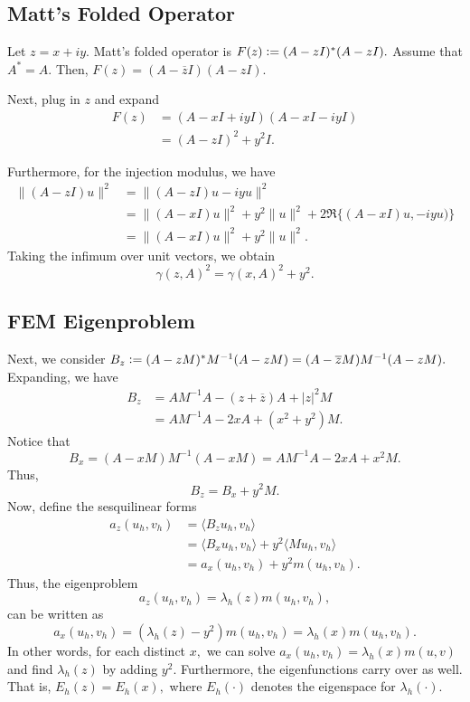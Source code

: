 \documentclass[12pt,a4paper]{article}
\newcommand{\defeq}{\vcentcolon=}
\begin{document}
\subsection{Matt's Folded Operator}

Let $z = x + iy.$ Matt's folded operator is $F(z) \defeq (A-zI)^*(A-zI).$ Assume that $A^*=A.$ Then,
$F(z) = (A-\overline{z}I)(A-zI).$

Next, plug in $z$ and expand
\begin{align}
    F(z) &= (A-xI + iyI)(A-xI-iyI)\\
    &=(A-zI)^2 + y^2 I.
\end{align}

Furthermore, for the injection modulus, we have
\begin{align}
    \|(A-zI) u \|^2 &= \| (A-zI) u - iyu \|^2 \\
    &= \| (A-xI)u \|^2 + y^2 \|u\|^2 + 2 \Re\{ (A-xI)u, -iyu ) \} \\
    &= \| (A-xI)u \|^2 + y^2 \|u\|^2.
\end{align}
Taking the infimum over unit vectors, we obtain
\begin{equation}
    \gamma(z, A)^2 = \gamma(x, A)^2 + y^2. 
\end{equation}

\subsection{FEM Eigenproblem}

Next, we consider $B_z \defeq (A-zM)^*M^{-1}(A-zM) = (A-\overline{z}M)M^{-1}(A-zM).$ Expanding, we have 
\begin{align}
    B_z &= AM^{-1}A - (z + \overline z) A + |z|^2 M \\
    &= AM^{-1} A - 2xA + (x^2 + y^2) M.
\end{align}
Notice that 
\begin{equation}
    B_x = (A-xM)M^{-1}(A-xM) = AM^{-1}A - 2xA + x^2 M.
\end{equation}
Thus, 
\begin{equation}
    B_z = B_x + y^2 M.
\end{equation}
Now, define the sesquilinear forms 
\begin{align}
    a_z(u_h, v_h) &= \langle B_z u_h, v_h \rangle \\
    &= \langle B_x u_h, v_h \rangle + y^2 \langle M u_h, v_h \rangle  \\
    &= a_x(u_h, v_h) + y^2 m(u_h, v_h).
\end{align}
Thus, the eigenproblem 
\begin{equation}
    a_z(u_h, v_h) = \lambda_h(z) m(u_h, v_h),
\end{equation}
can be written as 
\begin{equation}
    a_x(u_h, v_h) = (\lambda_h(z) - y^2) m(u_h, v_h) = \lambda_h(x) m(u_h, v_h).
\end{equation}
In other words, for each distinct $x,$ we can solve $a_x(u_h, v_h) = \lambda_h(x) m(u, v)$ and find $\lambda_h(z)$ by adding $y^2.$ Furthermore, the eigenfunctions carry over as well. That is, $E_h(z) = E_h(x),$ where $E_h(\cdot)$ denotes the eigenspace for $\lambda_h(\cdot).$
\end{document}
